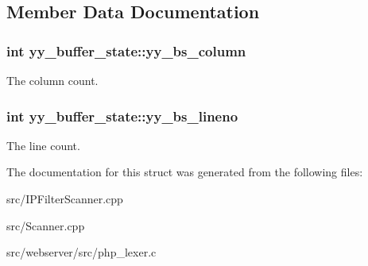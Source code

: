 \subsection{Member Data Documentation}
\subsubsection[{yy\_\-bs\_\-column}]{\setlength{\rightskip}{0pt plus 5cm}int {\bf yy\_\-buffer\_\-state::yy\_\-bs\_\-column}}\label{structyy__buffer__state_a10c4fcd8be759e6bf11e6d3e8cdb0307}


The column count. 
\subsubsection[{yy\_\-bs\_\-lineno}]{\setlength{\rightskip}{0pt plus 5cm}int {\bf yy\_\-buffer\_\-state::yy\_\-bs\_\-lineno}}\label{structyy__buffer__state_a818e94bc9c766e683c60df1e9fd01199}


The line count. 

The documentation for this struct was generated from the following files:\begin{DoxyCompactItemize}
\item 
src/IPFilterScanner.cpp\item 
src/Scanner.cpp\item 
src/webserver/src/php\_\-lexer.c\end{DoxyCompactItemize}
